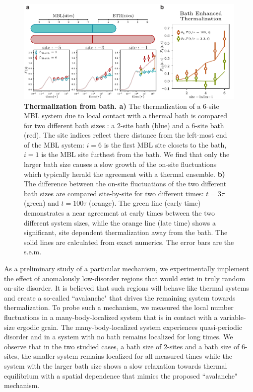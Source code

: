\begin{figure}[t!]
		\includegraphics[width=\columnwidth]{figures/ch7/bath_thermal/BathSSFig.pdf} 
		\caption{\textbf{Thermalization from bath. a)} The thermalization of a $6$-site MBL system due to local contact with a thermal bath is compared for two different bath sizes : a $2$-site bath (blue) and a $6$-site bath (red). The site indices reflect there distance from the left-most end of the MBL system: $i=6$ is the first MBL site closets to the bath, $i=1$ is the MBL site furthest from the bath. We find that only the larger bath size causes a slow growth of the on-site fluctuations which typically herald the agreement with a thermal ensemble. \textbf{b)} The difference between the on-site fluctuations of the two different bath sizes are compared site-by-site for two different times: $t=3\tau$ (green) and $t=100\tau$ (orange). The green line (early time) demonstrates a near agreement at early times between the two different system sizes, while the orange line (late time) shows a significant, site dependent thermalization away from the bath. The solid lines are calculated from exact numerics. The error bars are the s.e.m.}
		\label{fig:bath_sz}	
\end{figure}

As a preliminary study of a particular mechanism, we experimentally implement the effect of anomalously low-disorder regions that would exist in truly random on-site disorder. It is believed that such regions will behave like thermal systems and create a so-called ``avalanche" that drives the remaining system towards thermalization\cite{Roeck2017,Luitz2017}. To probe such a mechanism, we measured the local number fluctuations in a many-body-localized system that is in contact with a variable-size ergodic grain. The many-body-localized system experiences quasi-periodic disorder and in a system with no bath remains localized for long times. We observe that in the two studied cases, a bath size of $2$-sites and a bath size of $6$-sites, the smaller system  remains localized for all measured times while the system with the larger bath size shows a slow relaxation towards thermal equilibrium with a spatial dependence that mimics the proposed ``avalanche" mechanism.

